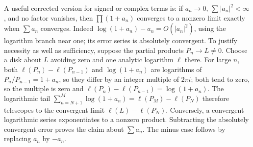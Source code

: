 A useful corrected version for signed or complex terms is: if
$a_n\to0$, $\sum|a_n|^2<\infty$, and no factor vanishes, then
$\prod(1+a_n)$ converges to a nonzero limit exactly when $\sum a_n$
converges. Indeed $\log(1+a_n)-a_n=O(|a_n|^2)$, using the logarithm
branch near one; its error series is absolutely convergent. To justify
necessity as well as sufficiency, suppose the partial products $P_n\to L\ne0$.
Choose a disk about $L$ avoiding zero and one analytic logarithm $\ell$
there. For large $n$, both $\ell(P_n)-\ell(P_{n-1})$ and
$\log(1+a_n)$ are logarithms of $P_n/P_{n-1}=1+a_n$, so they differ by an
integer multiple of $2\pi i$; both tend to zero, so the multiple is zero
and $\ell(P_n)-\ell(P_{n-1})=\log(1+a_n)$. The logarithmic tail
$\sum_{n=N+1}^M\log(1+a_n)=\ell(P_M)-\ell(P_N)$ therefore telescopes to
the convergent limit $\ell(L)-\ell(P_N)$.
Conversely, a convergent logarithmic series exponentiates to a nonzero
product. Subtracting the absolutely convergent error proves the claim
about $\sum a_n$. The minus case follows by replacing $a_n$ by $-a_n$.

